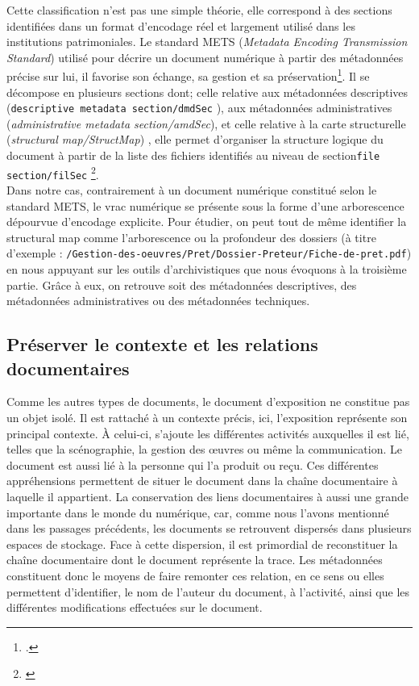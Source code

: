 Cette classification n'est pas une simple théorie, elle correspond à des sections identifiées dans un format d'encodage réel et largement utilisé dans les institutions patrimoniales. Le standard METS (\textit{Metadata Encoding Transmission Standard}) utilisé pour décrire un document numérique à partir des métadonnées précise sur lui, il favorise son échange, sa gestion et sa préservation\footnote{\cite{bnf_mets}.}. Il se décompose en plusieurs sections dont; celle relative aux métadonnées descriptives (\texttt{descriptive metadata section/dmdSec} ), aux métadonnées administratives (\textit{administrative metadata section/amdSec}), et celle relative à la carte structurelle (\textit{structural map/StructMap}) , elle permet d'organiser la structure logique du document à partir de la liste des fichiers identifiés au niveau de section\texttt{file section/filSec} \footnote{\cite{bnf-document-numerique-metadonnees}}.\\[0.1cm]

Dans notre cas, contrairement à un document numérique constitué selon le standard METS, le vrac numérique se présente sous la forme d'une arborescence dépourvue d'encodage explicite. Pour étudier, on peut tout de même identifier la structural map comme l'arborescence ou la profondeur des dossiers (à titre d'exemple : \texttt{/Gestion-des-oeuvres/\allowbreak Pret/\allowbreak Dossier-Preteur/\allowbreak Fiche-de-pret.pdf}) en nous appuyant sur les outils d'archivistiques que nous évoquons à la troisième partie. Grâce à eux, on retrouve soit des métadonnées descriptives, des métadonnées administratives ou des métadonnées techniques.



\subsection*{Préserver le contexte et les relations documentaires}

Comme les autres types de documents, le document d'exposition ne constitue pas un objet isolé. Il est rattaché à un contexte précis, ici, l'exposition représente son principal contexte. À celui-ci, s'ajoute les différentes activités auxquelles il est lié, telles que la scénographie, la gestion des œuvres ou même la communication. Le document est aussi lié à la personne qui l'a produit ou reçu. Ces différentes appréhensions permettent de situer le document dans la chaîne documentaire à laquelle il appartient. La conservation des liens documentaires à aussi une grande importante dans le monde du numérique, car, comme nous l'avons mentionné dans les passages précédents, les documents se retrouvent dispersés dans plusieurs espaces de stockage. Face à cette dispersion, il est primordial de reconstituer la chaîne documentaire dont le document représente la trace. Les métadonnées constituent donc le moyens de faire remonter ces relation, en ce sens ou elles permettent d'identifier, le nom de l'auteur du document, à l'activité, ainsi que les différentes modifications effectuées sur le document.

